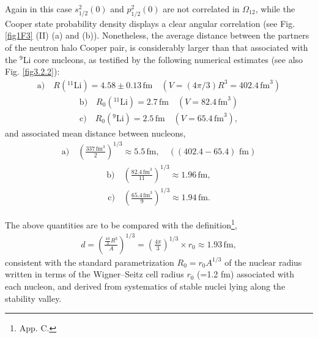 Again in this case $s_{1/2}^2(0)$ and $p_{1/2}^2(0)$ are not correlated in $\Omega_{12}$, while the Cooper state probability density displays a clear angular correlation (see Fig. \ref{fig1F3} (II) (a) and (b)). Nonetheless, the average distance between the partners of the neutron halo Cooper pair, is considerably larger than that associated with the $^9$Li core nucleons, as testified by the following numerical estimates (see also Fig. \ref{fig3.2.2}):
\begin{align}\label{eq3.2.21}
 \text{a)}\quad R(^{11}\text{Li})= 4.58\pm 0.13 \,\text{fm}\quad (V=\left(4\pi/3\right)R^3=402.4 \,\text{fm}^3)
\end{align}
\begin{align}
 \text{b)}\quad R_0 (^{11}\text{Li})=2.7\,\text{fm}\quad (V=82.4\,\text{fm}^3)
\end{align}
\begin{align}
 \text{c)}\quad R_0 (^{9}\text{Li})=2.5\,\text{fm}\quad (V=65.4\,\text{fm}^3),
\end{align}
and associated mean distance between nucleons, 
\begin{align}\label{eq3.2.24}
 \text{a)}\quad \left(\frac{337\,\text{fm}^3}{2}\right)^{1/3}\approx 5.5\,\text{fm},\quad((402.4-65.4)\text{ fm})
\end{align}
\begin{align}
 \text{b)}\quad \left(\frac{82.4\,\text{fm}^3}{11}\right)^{1/3}\approx 1.96\,\text{fm},
\end{align}
\begin{align}\label{eq4.3.9}
 \text{c)}\quad \left(\frac{65.4\,\text{fm}^3}{9}\right)^{1/3}\approx 1.94\,\text{fm}.
\end{align}



The above quantities are to be compared with the definition\footnote{\cite{Brink:05} App. C.},
\begin{align}\label{eq3.2.27}
d=\left(\frac{\frac{4\pi}{3}R^3}{A}\right)^{1/3}=\left(\frac{4\pi}{3}\right)^{1/3}\times r_0\approx 1.93\, \text{fm},
\end{align} 
consistent with the standard parametrization $R_0=r_0A^{1/3}$ of the nuclear radius written in terms of the Wigner--Seitz cell radius $r_0$ (=1.2 fm)  associated with each nucleon, and derived from systematics of stable nuclei lying along the stability valley.
